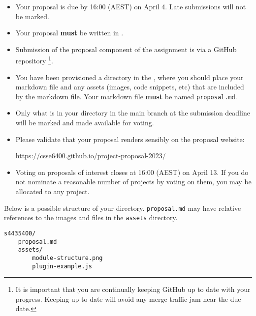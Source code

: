 \documentclass{csse4400}
\begin{document}
\begin{itemize}
    \item Your proposal is due by 16:00 (AEST) on April 4. Late submissions will not be marked.
    \item Your proposal \textbf{must} be written in .
    \item Submission of the proposal component of the assignment is via a GitHub repository%
             \footnote{It is important that you are continually keeping GitHub up to date with your progress.
              Keeping up to date will avoid any merge traffic jam near the due date.}.
    \item You have been provisioned a directory in the ,
          where you should place your markdown file and any assets (images, code snippets, etc) that are included by the markdown file.
          Your markdown file \textbf{must} be named \texttt{proposal.md}.
    \item Only what is in your directory in the main branch at the submission deadline will be marked and made available for voting.
    \item Please validate that your proposal renders sensibly on the proposal website:

        \url{https://csse6400.github.io/project-proposal-2023/}
    \item Voting on proposals of interest closes at 16:00 (AEST) on April 13.
          If you do not nominate a reasonable number of projects by voting on them, you may be allocated to any project.
\end{itemize}

\noindent
Below is a possible structure of your directory.
\texttt{proposal.md} may have relative references to the images and files in the \texttt{assets} directory.

\begin{verbatim}
s4435400/
    proposal.md
    assets/
        module-structure.png
        plugin-example.js
\end{verbatim}
\end{document}

